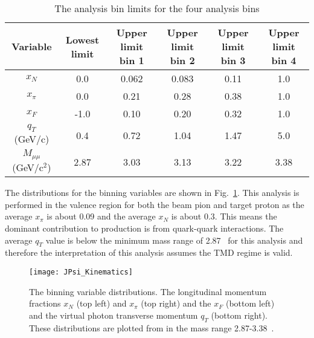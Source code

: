 \begin{table}[h!t]
  \begin{adjustwidth}{-1.4cm}{}
  \centering
  \begin{tabular}{ |c|c|c|c|c|c| }
    \hline \textbf{Variable}& \textbf{Lowest limit}& \textbf{Upper limit bin
      1}& \textbf{Upper limit bin 2}& \textbf{Upper limit bin 3}&
    \textbf{Upper limit bin 4}\\ \hline
    
    $x_N$& 0.0& 0.062& 0.083& 0.11& 1.0\\ \hline
    
    $x_{\pi}$& 0.0& 0.21& 0.28& 0.38& 1.0\\ \hline
    
    $x_F$& -1.0& 0.10& 0.20& 0.32& 1.0\\ \hline
    
    $q_T$ (GeV/c)& 0.4& 0.72& 1.04& 1.47& 5.0\\ \hline
    
    $M_{\mu\mu}$ (GeV/c$^2$)& 2.87& 3.03& 3.13& 3.22& 3.38 \\ \hline
    
  \end{tabular}
  \caption{The {\jp} analysis bin limits for the four analysis bins}
  \label{tab::JPsi_binning}
  \end{adjustwidth}
\end{table}

The distributions for the binning variables are shown in
Fig.~\ref{fig::JPsi_Kinematics}.  This analysis is performed in the valence
region for both the beam pion and target proton as the average $x_\pi$ is about
0.09 and the average $x_N$ is about 0.3.  This means the dominant contribution
to {\jp} production is from quark-quark interactions.  The average $q_T$ value
is below the minimum mass range of 2.87~{\gvcw} for this analysis and therefore
the interpretation of this analysis assumes the TMD regime is valid.

\begin{figure}[h!t]
  \centering \texttt{[image: JPsi\_Kinematics]}
  \caption{The binning variable distributions. The longitudinal momentum
    fractions $x_N$ (top left) and $x_\pi$ (top right) and the $x_F$ (bottom
    left) and the virtual photon transverse momentum $q_T$ (bottom right).
    These distributions are plotted from in the mass range 2.87-3.38~{\gvcw}.}
  \label{fig::JPsi_Kinematics}
\end{figure}


